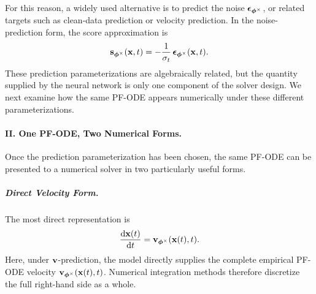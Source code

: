 For this reason, a widely used alternative is to predict the noise
${\bm{\epsilon}}_{\bm{\phi}^\times}$, or related targets such as clean-data prediction
or velocity prediction. In the noise-prediction form, the score approximation is
\[
    {\mathbf{s}}_{\bm{\phi}^\times}({\mathbf{x}},t)
    =
    -\frac{1}{\sigma_t}\,
    {\bm{\epsilon}}_{\bm{\phi}^\times}({\mathbf{x}},t).
\]
These prediction parameterizations are algebraically related, but the
quantity supplied by the neural network is only one component of the solver
design. We next examine how the same PF-ODE appears numerically under these
different parameterizations.



\paragraph{II. One PF-ODE, Two Numerical Forms.}
Once the prediction parameterization has been chosen, the same PF-ODE can be
presented to a numerical solver in two particularly useful forms.

\subparagraph{Direct Velocity Form.}
The most direct representation is
\begin{equation}
\label{eq:direct-pfode-form}
\frac{\mathop{}\!\mathrm{d} {\mathbf{x}}(t)}{\mathop{}\!\mathrm{d} t}
=
{\mathbf{v}}_{\bm{\phi}^\times}({\mathbf{x}}(t),t).
\end{equation}
Here, under ${\mathbf{v}}$-prediction, the model directly supplies the complete
empirical PF-ODE velocity ${\mathbf{v}}_{\bm{\phi}^\times}({\mathbf{x}}(t),t)$. Numerical
integration methods therefore discretize the full right-hand side as a whole.

